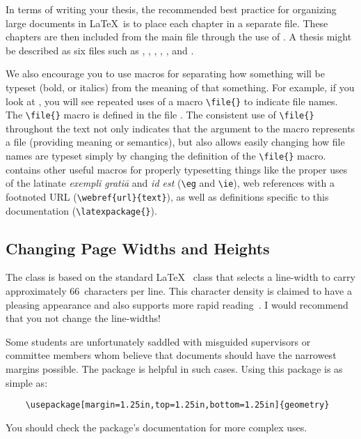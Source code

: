 In terms of writing your thesis, the recommended best practice for
organizing large documents in \LaTeX\ is to place each chapter in
a separate file.  These chapters are then included from the main
file through the use of \verb++.  A thesis might
be described as six files such as ,
, , ,
, and .

We also encourage you to use macros for separating how something
will be typeset (\eg bold, or italics) from the meaning of that
something. 
For example, if you look at , you will see repeated
uses of a macro \verb+\file{}+ to indicate file names.
The \verb+\file{}+ macro is defined in the file .
The consistent use of \verb+\file{}+ throughout the text not only
indicates that the argument to the macro represents a file (providing
meaning or semantics), but also allows easily changing how
file names are typeset simply by changing the definition of the
\verb+\file{}+ macro.
 contains other useful macros for properly typesetting
things like the proper uses of the latinate \emph{exempli grati\={a}}
and \emph{id est} (\ie \verb+\eg+ and \verb+\ie+), 
web references with a footnoted \acs{URL} (\verb+\webref{url}{text}+),
as well as definitions specific to this documentation
(\verb+\latexpackage{}+).

\subsection{Changing Page Widths and Heights}

The  class is based on the standard \LaTeX\ 
class that selects a line-width to carry approximately 66~characters
per line.  This character density is claimed to have a pleasing
appearance and also supports more rapid
reading~\cite{bringhurst-2002-teots}.  I would recommend that you
not change the line-widths!

Some students are unfortunately saddled with misguided supervisors
or committee members whom believe that documents should have the
narrowest margins possible.  The  package is
helpful in such cases.  Using this package is as simple as:
\begin{lstlisting}
    \usepackage[margin=1.25in,top=1.25in,bottom=1.25in]{geometry}
\end{lstlisting}
You should check the package's documentation for more complex uses.

